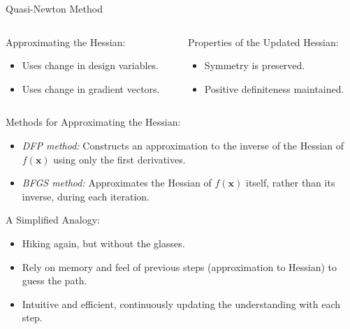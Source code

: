 \documentclass[
    NAME={Dr. Helga Ingimundardóttir},
    EMAIL={helgaingim@hi.is},
    FACULTY={Industrial Engineering},
    TITLE={Nonlinear Optimization},
    SUBTITLE={Approaches and Challenges},
    SEMINAR={VÉL113F},
    DATE={Design and Optimization}
]{../HI-latex/hi-beamer}
\begin{document}
\begin{frame}{Quasi-Newton Method}
        \begin{columns}
            \begin{column}{0.5\textwidth}
                \alert{Approximating the Hessian:}
                \begin{itemize}
                    \item Uses change in design variables.
                    \item Uses change in gradient vectors.
                \end{itemize}
            \end{column}
            \begin{column}{0.5\textwidth}
                \alert{Properties of the Updated Hessian:}
                \begin{itemize}
                    \item Symmetry is preserved.
                    \item Positive definiteness maintained.
                \end{itemize}
            \end{column}
        \end{columns}
        \alert{Methods for Approximating the Hessian:}
        \begin{itemize}
            \item \emph{DFP method:} Constructs an approximation to the inverse of the Hessian of \(f(\mathbf{x})\)
            using only the first derivatives.
            \item \emph{BFGS method:} Approximates the Hessian of \(f(\mathbf{x})\) itself, rather than its inverse,
            during each iteration.
        \end{itemize}

        \alert{A Simplified Analogy:}
        \begin{itemize}
            \item Hiking again, but without the glasses.
            \item Rely on memory and feel of previous steps (approximation to Hessian) to guess the path.
            \item Intuitive and efficient, continuously updating the understanding with each step.
        \end{itemize}

    \end{frame}
\end{document}
